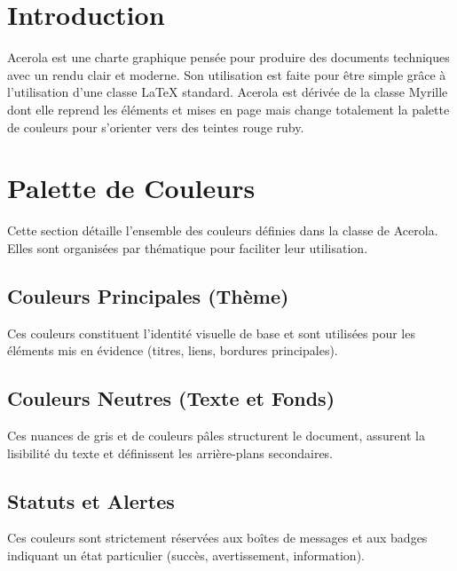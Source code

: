 \section{Introduction}
Acerola est une charte graphique pensée pour produire des documents techniques avec un rendu clair et moderne. Son utilisation est faite pour être simple grâce à l'utilisation d'une classe \LaTeX{} standard. Acerola est dérivée de la classe Myrille dont elle reprend les éléments et mises en page mais change totalement la palette de couleurs pour s'orienter vers des teintes rouge ruby.

\section{Palette de Couleurs}

Cette section détaille l'ensemble des couleurs définies dans la classe de Acerola. Elles sont organisées par thématique pour faciliter leur utilisation. 

\subsection{Couleurs Principales (Thème)}
Ces couleurs constituent l'identité visuelle de base et sont utilisées pour les éléments mis en évidence (titres, liens, bordures principales).

\vspace{10pt}

\subsection{Couleurs Neutres (Texte et Fonds)}
Ces nuances de gris et de couleurs pâles structurent le document, assurent la lisibilité du texte et définissent les arrière-plans secondaires.

\vspace{10pt}

\subsection{Statuts et Alertes}
Ces couleurs sont strictement réservées aux boîtes de messages et aux badges indiquant un état particulier (succès, avertissement, information).

